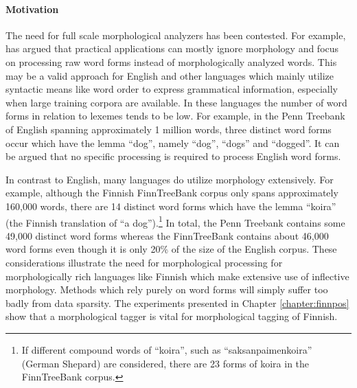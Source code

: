 \paragraph{Motivation} The need for full scale morphological analyzers
has been contested. For example, \cite{Church2005} has argued that
practical applications can mostly ignore morphology and focus on
processing raw word forms instead of morphologically analyzed
words. This may be a valid approach for English and other languages
which mainly utilize syntactic means like word order to express
grammatical information, especially when large training corpora are
available. In these languages the number of word forms in relation to
lexemes tends to be low. For example, in the Penn Treebank of English
\cite{Marcus1993} spanning approximately 1 million words, three
distinct word forms occur which have the lemma ``dog'', namely
``dog'', ``dogs'' and ``dogged''. It can be argued that no specific
processing is required to process English word forms.

In contrast to English, many languages do utilize morphology
extensively. For example, although the Finnish FinnTreeBank corpus
\citep{Voutilainen2011} only spans approximately 160,000 words, there
are 14 distinct word forms which have the lemma ``koira'' (the Finnish
translation of ``a dog'').\footnote{If different compound words of
  ``koira'', such as ``saksanpaimenkoira'' (German Shepard) are
  considered, there are 23 forms of koira in the FinnTreeBank corpus.}
In total, the Penn Treebank contains some 49,000 distinct word forms
whereas the FinnTreeBank contains about 46,000 word forms even though
it is only 20\% of the size of the English corpus. These
considerations illustrate the need for morphological processing for
morphologically rich languages like Finnish which make extensive use
of inflective morphology. Methods which rely purely on word forms will
simply suffer too badly from data sparsity. The experiments presented
in Chapter \ref{chapter:finnpos} show that a morphological tagger is
vital for morphological tagging of Finnish.

